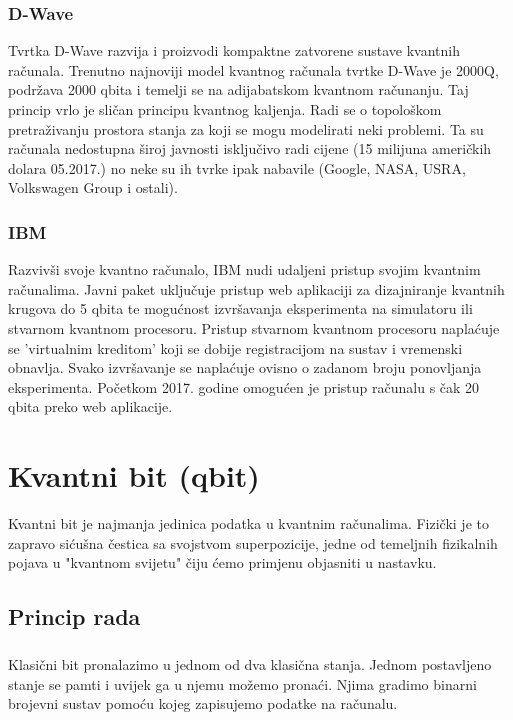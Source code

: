 \documentclass[times, utf8, zavrsni]{fer}
\begin{document}
\subsection{D-Wave}
Tvrtka D-Wave razvija i proizvodi kompaktne zatvorene sustave kvantnih računala. Trenutno najnoviji model kvantnog računala tvrtke D-Wave je 2000Q, podržava 2000 qbita i temelji se na adijabatskom kvantnom računanju. Taj princip vrlo je sličan principu kvantnog kaljenja. Radi se o topološkom pretraživanju prostora stanja za koji se mogu modelirati neki problemi.
Ta su računala nedostupna široj javnosti isključivo radi cijene (15 milijuna američkih dolara 05.2017.) no neke su ih tvrke ipak nabavile (Google, NASA, USRA, Volkswagen Group i ostali).

\subsection{IBM}
Razvivši svoje kvantno računalo, IBM nudi udaljeni pristup svojim kvantnim računalima. Javni paket uključuje pristup web aplikaciji za dizajniranje kvantnih krugova do 5 qbita te mogućnost izvršavanja eksperimenta na simulatoru ili stvarnom kvantnom procesoru. Pristup stvarnom kvantnom procesoru naplaćuje se 'virtualnim kreditom' koji se dobije registracijom na sustav i vremenski obnavlja. Svako izvršavanje se naplaćuje ovisno o zadanom broju ponovljanja eksperimenta. Početkom 2017. godine omogućen je pristup računalu s čak 20 qbita preko web aplikacije.

\chapter{Kvantni bit (qbit)}
Kvantni bit je najmanja jedinica podatka u kvantnim računalima. Fizički je to zapravo sićušna čestica sa svojstvom superpozicije, jedne od temeljnih fizikalnih pojava u "kvantnom svijetu" čiju ćemo primjenu objasniti u nastavku.

\section{Princip rada}
\paragraph{}
Klasični bit pronalazimo u jednom od dva klasična stanja. Jednom postavljeno stanje se pamti i uvijek ga u njemu možemo pronaći. Njima gradimo binarni brojevni sustav pomoću kojeg zapisujemo podatke na računalu.
\end{document}
